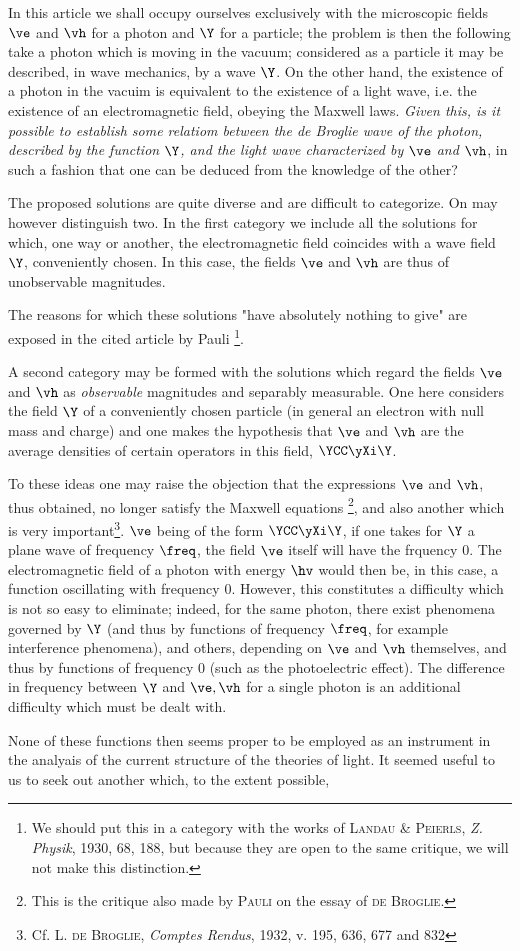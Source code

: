 \documentclass{article}
\renewcommand{\it}[1]{\textit{#1}}
\renewcommand{\sc}[1]{\textsc{#1}}
\begin{document}
\begin{multicols}{2}
In this article we shall occupy ourselves exclusively with the microscopic fields $\ve$ and $\vh$ for a photon and $\Y$ for a particle; the problem is then the following
 take a photon which is moving in the vacuum; considered as a particle it may be described, in wave mechanics, by a wave $\Y$. On the other hand, the existence of a photon in the vacuim is equivalent to the existence of a light wave, i.e. the existence of an electromagnetic field, obeying the Maxwell laws. \it{Given this, is it possible to establish some relatiom between the de Broglie wave of the photon, described by the function $\Y$, and the light wave characterized by $\ve$ and $\vh$}, in such a fashion that one can be deduced from the knowledge of the other?
 
The proposed solutions are quite diverse and are difficult to categorize. On may however distinguish two. In the first category we include all the solutions for which, one way or another, the electromagnetic field coincides with a wave field $\Y$, conveniently chosen. In this case, the fields $\ve$ and $\vh$ are thus of unobservable magnitudes.

The reasons for which these solutions "have absolutely nothing to give" are exposed in the cited article by Pauli \footnote{We should put this in a category with the works of \sc{Landau \& Peierls}, \it{Z. Physik}, 1930, 68, 188, but because they are open to the same critique, we will not make this distinction.}.

A second category may be formed with the solutions which regard the fields $\ve$ and $\vh$ as \it{observable} magnitudes and separably measurable. One here considers the field $\Y$ of a conveniently chosen particle (in general an electron with null mass and charge) and one makes the hypothesis that $\ve$ and $\vh$ are the average densities of certain operators in this field, $\YCC\yXi\Y$.

To these ideas one may raise the objection that the expressions $\ve$ and $\vh$, thus obtained, no longer satisfy the Maxwell equations \footnote{This is the critique also made by \sc{Pauli} on the essay of \sc{de Broglie}.},  and also another which is very important\footnote{Cf. \sc{L. de Broglie}, \it{Comptes Rendus}, 1932, v. 195, 636, 677 and 832}. $\ve$ being of the form $\YCC\yXi\Y$, if one takes for $\Y$ a plane wave of frequency $\freq$, the field $\ve$ itself will have the frquency $0$. The electromagnetic field of a photon with energy $\hv$ would then be, in this case, a function oscillating with frequency $0$. However, this constitutes a difficulty which is not so easy to eliminate; indeed, for the same photon, there exist phenomena governed by $\Y$ (and thus by functions of frequency $\freq$, for example interference phenomena), and others, depending on $\ve$ and $\vh$ themselves, and thus by functions of frequency $0$ (such as the photoelectric effect). The difference in frequency between $\Y$ and $\ve,\vh$ for a single photon is an additional difficulty which must be dealt with.

None of these functions then seems proper
to be employed as an instrument in the analyais of the current structure of the theories of light. It seemed useful to us to seek out another which, to the extent possible, 


\end{multicols}
\end{document}
